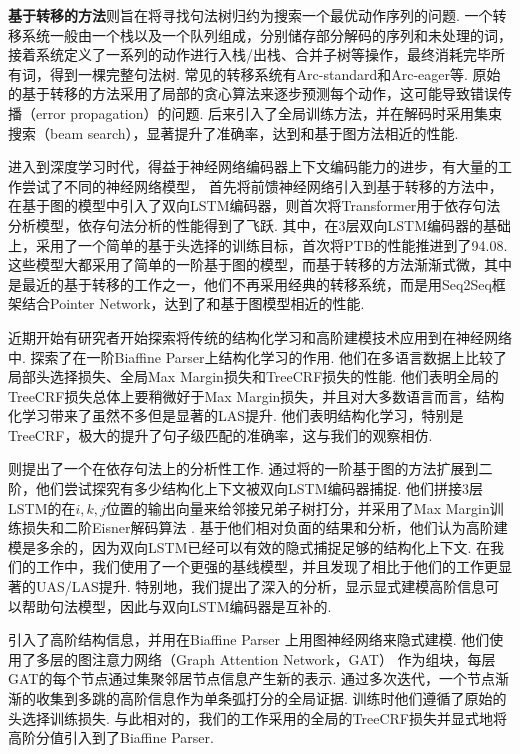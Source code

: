 \textbf{基于转移的方法}则旨在将寻找句法树归约为搜索一个最优动作序列的问题.
一个转移系统一般由一个栈以及一个队列组成，分别储存部分解码的序列和未处理的词，接着系统定义了一系列的动作进行入栈/出栈、合并子树等操作，最终消耗完毕所有词，得到一棵完整句法树.
常见的转移系统有Arc-standard和Arc-eager等.
原始的基于转移的方法采用了局部的贪心算法来逐步预测每个动作，这可能导致错误传播（error propagation）的问题.
后来\citet{zhang-clark-2008-tale,huang-etal-2009-bilingually}引入了全局训练方法，并在解码时采用集束搜索（beam search），显著提升了准确率，达到和基于图方法相近的性能.

进入到深度学习时代，得益于神经网络编码器上下文编码能力的进步，有大量的工作尝试了不同的神经网络模型，
\citet{chen-manning-2014-fast}首先将前馈神经网络引入到基于转移的方法中，\citet{kiperwasser-goldberg-2016-simple,wang-chang-2016-graph}在基于图的模型中引入了双向LSTM编码器，\citet{li-etal-2019-attentive}则首次将Transformer用于依存句法分析模型，依存句法分析的性能得到了飞跃.
其中，\citet{dozat-etal-2017-biaffine}在3层双向LSTM编码器的基础上，采用了一个简单的基于头选择的训练目标，首次将PTB的性能推进到了94.08.
这些模型大都采用了简单的一阶基于图的模型，而基于转移的方法渐渐式微，其中\citet{ma-etal-2018-stack}是最近的基于转移的工作之一，他们不再采用经典的转移系统，而是用Seq2Seq框架结合Pointer Network，达到了和基于图模型相近的性能.

近期开始有研究者开始探索将传统的结构化学习和高阶建模技术应用到在神经网络中.
\citet{zhang-etal-2019-empirical}探索了在一阶Biaffine Parser上结构化学习的作用.
他们在多语言数据上比较了局部头选择损失、全局Max Margin损失和TreeCRF损失的性能.
他们表明全局的TreeCRF损失总体上要稍微好于Max Margin损失，并且对大多数语言而言，结构化学习带来了虽然不多但是显著的LAS提升.
他们表明结构化学习，特别是TreeCRF，极大的提升了句子级匹配的准确率，这与我们的观察相仿.

\citet{falenska-kuhn-2019-non}则提出了一个在依存句法上的分析性工作.
通过将\citet{kiperwasser-goldberg-2016-simple}的一阶基于图的方法扩展到二阶，他们尝试探究有多少结构化上下文被双向LSTM编码器捕捉.
他们拼接3层LSTM的在$i,k,j$位置的输出向量来给邻接兄弟子树打分，并采用了Max Margin训练损失和二阶Eisner解码算法 \citep{mcdonald-pereira-2006-online}.
基于他们相对负面的结果和分析，他们认为高阶建模是多余的，因为双向LSTM已经可以有效的隐式捕捉足够的结构化上下文.
在我们的工作中，我们使用了一个更强的基线模型，并且发现了相比于他们的工作更显著的UAS/LAS提升.
特别地，我们提出了深入的分析，显示显式建模高阶信息可以帮助句法模型，因此与双向LSTM编码器是互补的.

\citet{ji-etal-2019-graph}引入了高阶结构信息，并用在Biaffine Parser \citep{dozat-etal-2017-biaffine}上用图神经网络来隐式建模.
他们使用了多层的图注意力网络（Graph Attention Network，GAT） \citep{velickovic-etal-2018-graph}作为组块，每层GAT的每个节点通过集聚邻居节点信息产生新的表示.
通过多次迭代，一个节点渐渐的收集到多跳的高阶信息作为单条弧打分的全局证据.
训练时他们遵循了原始的头选择训练损失.
与此相对的，我们的工作采用的全局的TreeCRF损失并显式地将高阶分值引入到了Biaffine Parser.

